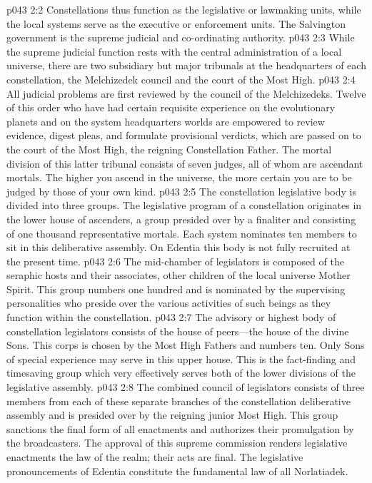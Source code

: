 \vs p043 2:2 Constellations thus function as the legislative or lawmaking units, while the local systems serve as the executive or enforcement units. The Salvington government is the supreme judicial and co\hyp{}ordinating authority.
\pc \vs p043 2:3 While the supreme judicial function rests with the central administration of a local universe, there are two subsidiary but major tribunals at the headquarters of each constellation, the Melchizedek council and the court of the Most High.
\vs p043 2:4 All judicial problems are first reviewed by the council of the Melchizedeks. Twelve of this order who have had certain requisite experience on the evolutionary planets and on the system headquarters worlds are empowered to review evidence, digest pleas, and formulate provisional verdicts, which are passed on to the court of the Most High, the reigning Constellation Father. The mortal division of this latter tribunal consists of seven judges, all of whom are ascendant mortals. The higher you ascend in the universe, the more certain you are to be judged by those of your own kind.\plusone
\pc \vs p043 2:5 The constellation legislative body is divided into three groups. The legislative program of a constellation originates in the lower house of ascenders, a group presided over by a finaliter and consisting of one thousand representative mortals. Each system nominates ten members to sit in this deliberative assembly. On Edentia this body is not fully recruited at the present time.
\vs p043 2:6 The mid\hyp{}chamber of legislators is composed of the seraphic hosts and their associates, other children of the local universe Mother Spirit. This group numbers one hundred and is nominated by the supervising personalities who preside over the various activities of such beings as they function within the constellation.
\vs p043 2:7 The advisory or highest body of constellation legislators consists of the house of peers---the house of the divine Sons. This corps is chosen by the Most High Fathers and numbers ten. Only Sons of special experience may serve in this upper house. This is the fact\hyp{}finding and timesaving group which very effectively serves both of the lower divisions of the legislative assembly.
\vs p043 2:8 The combined council of legislators consists of three members from each of these separate branches of the constellation deliberative assembly and is presided over by the reigning junior Most High. This group sanctions the final form of all enactments and authorizes their promulgation by the broadcasters. The approval of this supreme commission renders legislative enactments the law of the realm; their acts are final. The legislative pronouncements of Edentia constitute the fundamental law of all Norlatiadek.

